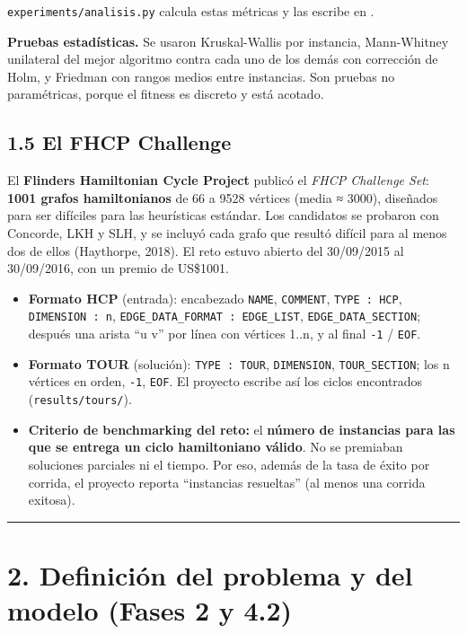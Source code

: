 \documentclass[
  spanish,
  12pt,
]{article}
\providecommand{\tightlist}{%
  \setlength{\itemsep}{0pt}\setlength{\parskip}{0pt}}
\begin{document}
\texttt{experiments/analisis.py} calcula estas métricas y las escribe en
.

\textbf{Pruebas estadísticas.} Se usaron Kruskal-Wallis por instancia,
Mann-Whitney unilateral del mejor algoritmo contra cada uno de los demás
con corrección de Holm, y Friedman con rangos medios entre instancias.
Son pruebas no paramétricas, porque el fitness es discreto y está
acotado.

\subsection{1.5 El FHCP Challenge}\label{el-fhcp-challenge}

El \textbf{Flinders Hamiltonian Cycle Project} publicó el \emph{FHCP
Challenge Set}: \textbf{1001 grafos hamiltonianos} de 66 a 9528 vértices
(media ≈ 3000), diseñados para ser difíciles para las heurísticas
estándar. Los candidatos se probaron con Concorde, LKH y SLH, y se
incluyó cada grafo que resultó difícil para al menos dos de ellos
(Haythorpe, 2018). El reto estuvo abierto del 30/09/2015 al 30/09/2016,
con un premio de US\$1001.

\begin{itemize}
\tightlist
\item
  \textbf{Formato HCP} (entrada): encabezado \texttt{NAME},
  \texttt{COMMENT}, \texttt{TYPE\ :\ HCP}, \texttt{DIMENSION\ :\ n},
  \texttt{EDGE\_DATA\_FORMAT\ :\ EDGE\_LIST},
  \texttt{EDGE\_DATA\_SECTION}; después una arista ``u v'' por línea con
  vértices 1..n, y al final \texttt{-1} / \texttt{EOF}.
\item
  \textbf{Formato TOUR} (solución): \texttt{TYPE\ :\ TOUR},
  \texttt{DIMENSION}, \texttt{TOUR\_SECTION}; los n vértices en orden,
  \texttt{-1}, \texttt{EOF}. El proyecto escribe así los ciclos
  encontrados (\texttt{results/tours/}).
\item
  \textbf{Criterio de benchmarking del reto:} el \textbf{número de
  instancias para las que se entrega un ciclo hamiltoniano válido}. No
  se premiaban soluciones parciales ni el tiempo. Por eso, además de la
  tasa de éxito por corrida, el proyecto reporta ``instancias
  resueltas'' (al menos una corrida exitosa).
\end{itemize}

\begin{center}\rule{0.5\linewidth}{0.5pt}\end{center}

\section{2. Definición del problema y del modelo (Fases 2 y
4.2)}\label{definiciuxf3n-del-problema-y-del-modelo-fases-2-y-4.2}
\end{document}
